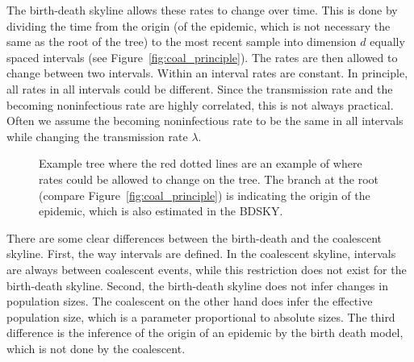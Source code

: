\documentclass[11pt]{article}
\begin{document}
The birth-death skyline allows these rates to change over time. This is done by dividing the time from the origin (of the epidemic, which is not necessary the same as the root of the tree) to the most recent sample into dimension $d$ equally spaced intervals (see Figure~\ref{fig:coal_principle}). The rates are then allowed to change between two intervals. Within an interval rates are constant. In principle, all rates in all intervals could be different. Since the transmission rate and the becoming noninfectious rate are highly correlated, this is not always practical. Often we assume the becoming noninfectious rate to be the same in all intervals while changing the transmission rate $\lambda$. 

\begin{figure}[h!]
\centering
{}
\caption{\small Example tree where the red dotted lines are an example of where rates could be allowed to change on the tree. The branch at the root (compare Figure~\ref{fig:coal_principle}) is indicating the origin of the epidemic, which is also estimated in the BDSKY.}
\label{fig:bdsky_principle}
\end{figure}

There are some clear differences between the birth-death and the coalescent skyline. First, the way intervals are defined. In the coalescent skyline, intervals are always between coalescent events, while this restriction does not exist for the birth-death skyline. Second, the birth-death skyline does not infer changes in population sizes.
The coalescent on the other hand does infer the effective population size, which is a parameter proportional to absolute sizes. The third difference is the inference of the origin of an epidemic by the birth death model, which is not done by the coalescent.
\end{document}
